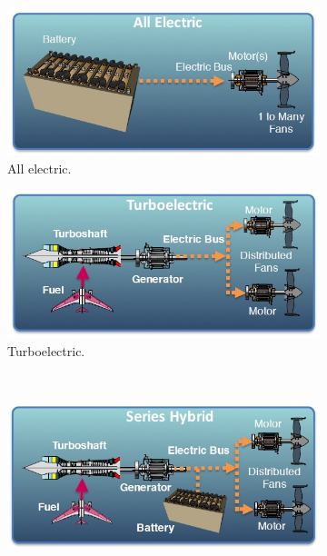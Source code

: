 \begin{figure}[!h]
	\centering
	\begin{subfigure}{0.3\textwidth}
		\centering
		\includegraphics[width=\linewidth, height=0.15\textheight]{images/chap1/all_electric.jpg}
		\caption{All electric.}
		\label{fig:all_electric}
	\end{subfigure}
	\hspace{10mm}
	\begin{subfigure}{0.3\textwidth}
		\centering
		\includegraphics[width=\linewidth, height=0.15\textheight]{images/chap1/turboelectric.jpg}
		\caption{Turboelectric.}
		\label{fig:turbo_electric}
	\end{subfigure}
	\\
	\begin{subfigure}{0.3\textwidth}
		\centering
		\includegraphics[width=\linewidth, height=0.15\textheight]{images/chap1/series_hybrid.jpg}

\end{subfigure}
\end{figure}
